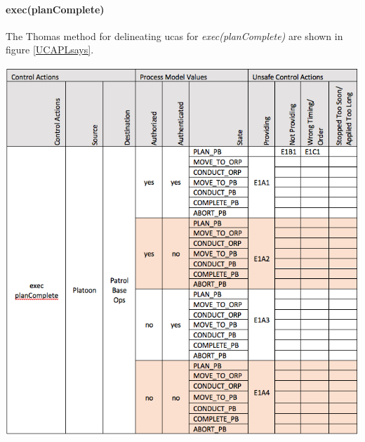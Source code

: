 \documentclass[../../main/main.tex]{subfiles}
\begin{document}
\paragraph*{exec(planComplete)}
The Thomas method for delineating \glspl{uca} for \textit{exec(planComplete)} are shown in figure \ref{UCAPLsays}.
\begin{table}[ht!]
\begin{center}
\includegraphics[width=\linewidth]{../figures/UCAexecplan}
\caption{Unsafe control actions \glspl{uca} for control action "exec(planComplete)."}
\label{UCAexecplan}
\end{center}
\end{table}

\clearpage
\end{document}
